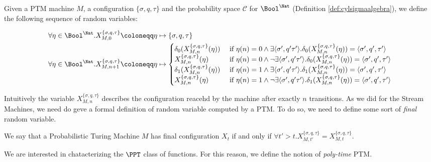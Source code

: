 \begin{defn}
  \label{def:ptmX}
Given a PTM machine $M$, a configuration $\{\sigma, q, \tau\}$
and the probability space $\mathcal C$ for
$\Bool^\Nat$ (Definition \ref{def:cylsigmaalgebra}), we define the following
sequence of random variables:

\begin{align*}
\forall \eta \in \Bool^\Nat. X_{M, 0}^{\{\sigma, q, \tau\}} &\coloneqq \eta \mapsto \{\sigma, q, \tau\}\\
\forall \eta \in \Bool^\Nat. X_{M, n+1}^{\{\sigma, q, \tau\}} & \coloneqq \eta \mapsto \begin{cases}
\delta_0(X_{M, n}^{\{\sigma, q, \tau\}}(\eta)) & \text{ if } \eta(n)=0 \land \exists \langle \sigma', q' \tau'\rangle. \delta_0(X_{M, n}^{\{\sigma, q, \tau\}}(\eta))=\langle \sigma', q', \tau'\rangle\\
X_{M, n}^{\{\sigma, q, \tau\}}(\eta) & \text{ if } \eta(n)=0 \land \lnot\exists \langle \sigma', q' \tau'\rangle. \delta_0(X_{M, n}^{\{\sigma, q, \tau\}}(\eta))=\langle \sigma', q', \tau'\rangle\\
\delta_1(X_{M, n}^{\{\sigma, q, \tau\}}(\eta)) & \text{ if } \eta(n)=1 \land \exists \langle \sigma', q' \tau'\rangle. \delta_1(X_{M, n}^{\{\sigma, q, \tau\}}(\eta))=\langle \sigma', q', \tau'\rangle\\
X_{M, n}^{\{\sigma, q, \tau\}}(\eta) & \text{ if } \eta(n)=1 \land \lnot\exists \langle \sigma', q' \tau'\rangle. \delta_1(X_{M, n}^{\{\sigma, q, \tau\}}(\eta))=\langle \sigma', q', \tau'\rangle
\end{cases}
\end{align*}
\end{defn}


Intuitively the variable $X_{M, n}^{\{\sigma, q, \tau\}}$ describes
the configuration reacehd by the machine after exactly $n$ transitions.
%
As we did for the Stream Machines, we need do geve a formal definition of random
variable computed by a PTM. To do so, we need to define some sort of
\emph{final} random variable.

\begin{defn}
We say that a Probabilistic Turing Machine $M$ has final configuration $X_t$
if and only if $\forall t'>t.X_{M, t'}^{\{\sigma, q, \tau\}}=X_{M, t}^{\{\sigma, q, \tau\}}$.
\end{defn}

We are interested in chatacterizing the $\PPT$ class of functions.
For this reason, we define the notion of \emph{poly-time} PTM.

